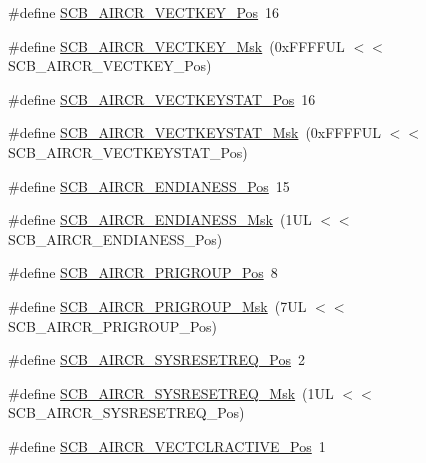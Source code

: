 \begin{DoxyCompactItemize}
\item 
\#define \hyperlink{group___c_m_s_i_s___s_c_b_gaaa27c0ba600bf82c3da08c748845b640}{S\-C\-B\-\_\-\-A\-I\-R\-C\-R\-\_\-\-V\-E\-C\-T\-K\-E\-Y\-\_\-\-Pos}~16
\item 
\#define \hyperlink{group___c_m_s_i_s___s_c_b_ga90c7cf0c490e7ae55f9503a7fda1dd22}{S\-C\-B\-\_\-\-A\-I\-R\-C\-R\-\_\-\-V\-E\-C\-T\-K\-E\-Y\-\_\-\-Msk}~(0x\-F\-F\-F\-F\-U\-L $<$$<$ S\-C\-B\-\_\-\-A\-I\-R\-C\-R\-\_\-\-V\-E\-C\-T\-K\-E\-Y\-\_\-\-Pos)
\item 
\#define \hyperlink{group___c_m_s_i_s___s_c_b_gaec404750ff5ca07f499a3c06b62051ef}{S\-C\-B\-\_\-\-A\-I\-R\-C\-R\-\_\-\-V\-E\-C\-T\-K\-E\-Y\-S\-T\-A\-T\-\_\-\-Pos}~16
\item 
\#define \hyperlink{group___c_m_s_i_s___s_c_b_gabacedaefeefc73d666bbe59ece904493}{S\-C\-B\-\_\-\-A\-I\-R\-C\-R\-\_\-\-V\-E\-C\-T\-K\-E\-Y\-S\-T\-A\-T\-\_\-\-Msk}~(0x\-F\-F\-F\-F\-U\-L $<$$<$ S\-C\-B\-\_\-\-A\-I\-R\-C\-R\-\_\-\-V\-E\-C\-T\-K\-E\-Y\-S\-T\-A\-T\-\_\-\-Pos)
\item 
\#define \hyperlink{group___c_m_s_i_s___s_c_b_gad31dec98fbc0d33ace63cb1f1a927923}{S\-C\-B\-\_\-\-A\-I\-R\-C\-R\-\_\-\-E\-N\-D\-I\-A\-N\-E\-S\-S\-\_\-\-Pos}~15
\item 
\#define \hyperlink{group___c_m_s_i_s___s_c_b_ga2f571f93d3d4a6eac9a3040756d3d951}{S\-C\-B\-\_\-\-A\-I\-R\-C\-R\-\_\-\-E\-N\-D\-I\-A\-N\-E\-S\-S\-\_\-\-Msk}~(1\-U\-L $<$$<$ S\-C\-B\-\_\-\-A\-I\-R\-C\-R\-\_\-\-E\-N\-D\-I\-A\-N\-E\-S\-S\-\_\-\-Pos)
\item 
\#define \hyperlink{group___c_m_s_i_s___s_c_b_gaca155deccdeca0f2c76b8100d24196c8}{S\-C\-B\-\_\-\-A\-I\-R\-C\-R\-\_\-\-P\-R\-I\-G\-R\-O\-U\-P\-\_\-\-Pos}~8
\item 
\#define \hyperlink{group___c_m_s_i_s___s_c_b_ga8be60fff03f48d0d345868060dc6dae7}{S\-C\-B\-\_\-\-A\-I\-R\-C\-R\-\_\-\-P\-R\-I\-G\-R\-O\-U\-P\-\_\-\-Msk}~(7\-U\-L $<$$<$ S\-C\-B\-\_\-\-A\-I\-R\-C\-R\-\_\-\-P\-R\-I\-G\-R\-O\-U\-P\-\_\-\-Pos)
\item 
\#define \hyperlink{group___c_m_s_i_s___s_c_b_gaffb2737eca1eac0fc1c282a76a40953c}{S\-C\-B\-\_\-\-A\-I\-R\-C\-R\-\_\-\-S\-Y\-S\-R\-E\-S\-E\-T\-R\-E\-Q\-\_\-\-Pos}~2
\item 
\#define \hyperlink{group___c_m_s_i_s___s_c_b_gaae1181119559a5bd36e62afa373fa720}{S\-C\-B\-\_\-\-A\-I\-R\-C\-R\-\_\-\-S\-Y\-S\-R\-E\-S\-E\-T\-R\-E\-Q\-\_\-\-Msk}~(1\-U\-L $<$$<$ S\-C\-B\-\_\-\-A\-I\-R\-C\-R\-\_\-\-S\-Y\-S\-R\-E\-S\-E\-T\-R\-E\-Q\-\_\-\-Pos)
\item 
\#define \hyperlink{group___c_m_s_i_s___s_c_b_gaa30a12e892bb696e61626d71359a9029}{S\-C\-B\-\_\-\-A\-I\-R\-C\-R\-\_\-\-V\-E\-C\-T\-C\-L\-R\-A\-C\-T\-I\-V\-E\-\_\-\-Pos}~1
$$
\end{DoxyCompactItemize}
